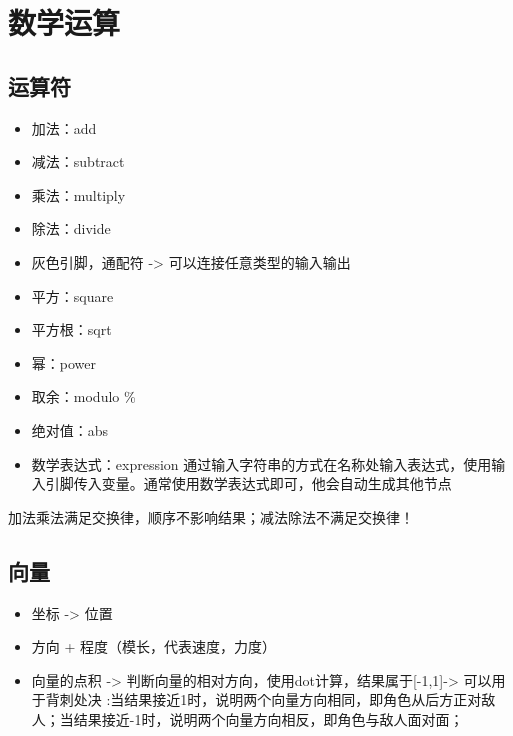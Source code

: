 \documentclass[11pt,oneside]{book}
\begin{document}

\chapter{数学运算}

\section{运算符}

\begin{itemize}
\item 加法：add
\item 减法：subtract
\item 乘法：multiply    
\item 除法：divide
\item 灰色引脚，通配符 -> 可以连接任意类型的输入输出
\item 平方：square
\item 平方根：sqrt
\item 幂：power 
\item 取余：modulo \%
\item 绝对值：abs
\item 数学表达式：expression 通过输入字符串的方式在名称处输入表达式，使用输入引脚传入变量。通常使用数学表达式即可，他会自动生成其他节点
\end{itemize}


\begin{warning}
加法乘法满足交换律，顺序不影响结果；减法除法不满足交换律！
\end{warning}

\section{向量}


\begin{itemize}
    \item 坐标 -> 位置
    \item 方向 + 程度（模长，代表速度，力度）
    \item 向量的点积 -> 判断向量的相对方向，使用dot计算，结果属于[-1,1]-> 可以用于背刺处决 :当结果接近1时，说明两个向量方向相同，即角色从后方正对敌人；当结果接近-1时，说明两个向量方向相反，即角色与敌人面对面；

\end{itemize}



\end{document}
